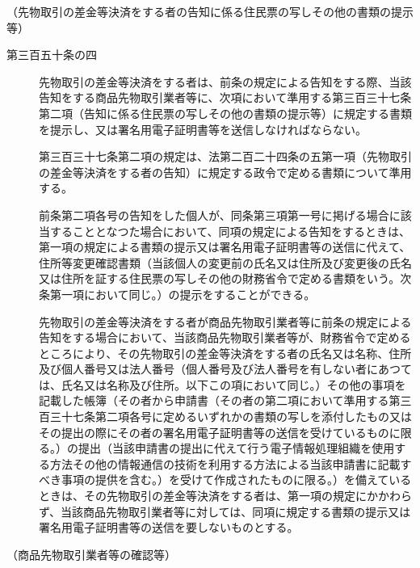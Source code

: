\documentclass[twocolumn,a4j,10pt]{ltjtarticle}
\begin{document}
\noindent\hspace{10pt}（先物取引の差金等決済をする者の告知に係る住民票の写しその他の書類の提示等）
\begin{description}
\item[第三百五十条の四]先物取引の差金等決済をする者は、前条の規定による告知をする際、当該告知をする商品先物取引業者等に、次項において準用する第三百三十七条第二項（告知に係る住民票の写しその他の書類の提示等）に規定する書類を提示し、又は署名用電子証明書等を送信しなければならない。
\item[]第三百三十七条第二項の規定は、法第二百二十四条の五第一項（先物取引の差金等決済をする者の告知）に規定する政令で定める書類について準用する。
\item[]前条第二項各号の告知をした個人が、同条第三項第一号に掲げる場合に該当することとなつた場合において、同項の規定による告知をするときは、第一項の規定による書類の提示又は署名用電子証明書等の送信に代えて、住所等変更確認書類（当該個人の変更前の氏名又は住所及び変更後の氏名又は住所を証する住民票の写しその他の財務省令で定める書類をいう。次条第一項において同じ。）の提示をすることができる。
\item[]先物取引の差金等決済をする者が商品先物取引業者等に前条の規定による告知をする場合において、当該商品先物取引業者等が、財務省令で定めるところにより、その先物取引の差金等決済をする者の氏名又は名称、住所及び個人番号又は法人番号（個人番号及び法人番号を有しない者にあつては、氏名又は名称及び住所。以下この項において同じ。）その他の事項を記載した帳簿（その者から申請書（その者の第二項において準用する第三百三十七条第二項各号に定めるいずれかの書類の写しを添付したもの又はその提出の際にその者の署名用電子証明書等の送信を受けているものに限る。）の提出（当該申請書の提出に代えて行う電子情報処理組織を使用する方法その他の情報通信の技術を利用する方法による当該申請書に記載すべき事項の提供を含む。）を受けて作成されたものに限る。）を備えているときは、その先物取引の差金等決済をする者は、第一項の規定にかかわらず、当該商品先物取引業者等に対しては、同項に規定する書類の提示又は署名用電子証明書等の送信を要しないものとする。
\end{description}
\noindent\hspace{10pt}（商品先物取引業者等の確認等）
\end{document}
